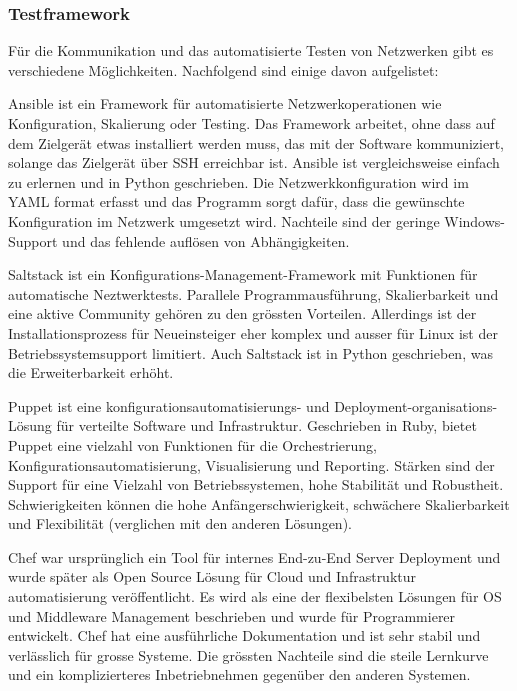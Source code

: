 \documentclass[
	ngerman,
	toc=listof, %
	toc=bibliography, %
	footnotes=multiple, %
	parskip=half, %
	numbers=noendperiod %
]{scrartcl}
\begin{document}
		\newpage

		\subsubsection{Testframework}
		Für die Kommunikation und das automatisierte Testen von Netzwerken gibt es verschiedene Möglichkeiten.
		Nachfolgend sind einige davon aufgelistet:
		
		Ansible ist ein Framework für automatisierte Netzwerkoperationen wie Konfiguration, Skalierung oder Testing.
		Das Framework arbeitet, ohne dass auf dem Zielgerät etwas installiert werden muss, das mit der Software kommuniziert, solange das Zielgerät über SSH erreichbar ist.
		Ansible ist vergleichsweise einfach zu erlernen und in Python geschrieben.
		Die Netzwerkkonfiguration wird im YAML format erfasst und das Programm sorgt dafür, dass die gewünschte Konfiguration im Netzwerk umgesetzt wird.
		Nachteile sind der geringe Windows-Support und das fehlende auflösen von Abhängigkeiten.

		Saltstack ist ein Konfigurations-Management-Framework mit Funktionen für automatische Neztwerktests.
		Parallele Programmausführung, Skalierbarkeit und eine aktive Community gehören zu den grössten Vorteilen.
		Allerdings ist der Installationsprozess für Neueinsteiger eher komplex und ausser für Linux ist der Betriebssystemsupport limitiert.
		Auch Saltstack ist in Python geschrieben, was die Erweiterbarkeit erhöht.
		
		Puppet ist eine konfigurationsautomatisierungs- und Deployment-organisations-Lösung für verteilte Software und Infrastruktur.
		Geschrieben in Ruby, bietet Puppet eine vielzahl von Funktionen für die Orchestrierung, Konfigurationsautomatisierung, Visualisierung und Reporting.
		Stärken sind der Support für eine Vielzahl von Betriebssystemen, hohe Stabilität und Robustheit.
		Schwierigkeiten können die hohe Anfängerschwierigkeit, schwächere Skalierbarkeit und Flexibilität (verglichen mit den anderen Lösungen).

		Chef war ursprünglich ein Tool für internes End-zu-End Server Deployment und wurde später als Open Source Lösung für Cloud und Infrastruktur automatisierung veröffentlicht.
		Es wird als eine der flexibelsten Lösungen für OS und Middleware Management beschrieben und wurde für Programmierer entwickelt.
		Chef hat eine ausführliche Dokumentation und ist sehr stabil und verlässlich für grosse Systeme.
		Die grössten Nachteile sind die steile Lernkurve und ein komplizierteres Inbetriebnehmen gegenüber den anderen Systemen.
\end{document}
